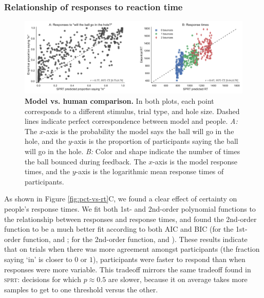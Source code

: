 \documentclass[10pt,letterpaper]{article}
\begin{document}
\subsubsection{Relationship of responses to reaction time}

\begin{figure}[t]
    \begin{center}
        \includegraphics[width=\textwidth]{figures/model_results.pdf}
        \caption{\textbf{Model vs. human comparison.} 
        In both plots, each point corresponds to a different stimulus, trial type, and hole size. 
        Dashed lines indicate perfect correspondence between model and people. 
        \emph{A:} The $x$-axis is the probability the model says the ball will go in the hole, and the $y$-axis is the proportion of participants saying the ball will go in the hole. 
        \emph{B:} Color and shape indicate the number of times the ball bounced during feedback. 
        The $x$-axis is the model response times, and the $y$-axis is the logarithmic mean response times of participants.}
        \label{fig:model-results}
    \end{center}
\end{figure}

As shown in Figure \ref{fig:pct-vs-rt}C, we found a clear effect of certainty on people's response times.
We fit both 1st- and 2nd-order polynomial functions to the relationship between responses and response times, and found the 2nd-order function to be a much better fit according to both AIC and BIC (for the 1st-order function, \AicFirstOrder{} and \BicFirstOrder{}; for the 2nd-order function, \AicSecondOrder{} and \BicSecondOrder{}).
These results indicate that on trials when there was more agreement amongst participants (the fraction saying `in' is closer to $0$ or $1$), participants were faster to respond than when responses were more variable.
This tradeoff mirrors the same tradeoff found in \textsc{sprt}: decisions for which $p\approx0.5$ are slower, because it on average takes more samples to get to one threshold versus the other.
\end{document}
